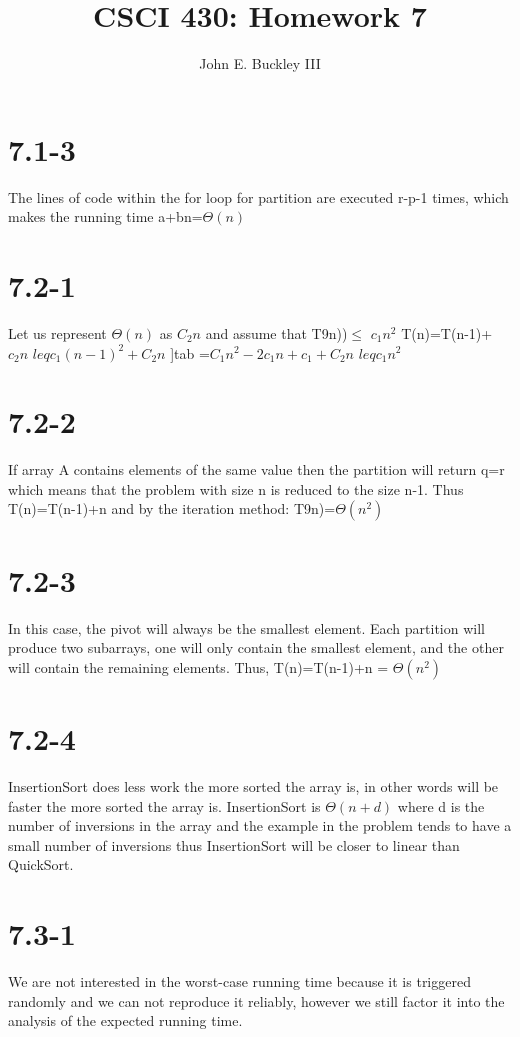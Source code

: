 \documentclass[12pt]{article}
\author{John E. Buckley III}
\title{CSCI 430: Homework 7}
\newcommand\tab[1][1cm]{\hspace*{#1}}
\begin{document}
\maketitle

\section{7.1-3}
The lines of code within the for loop for partition are executed r-p-1 times, which makes the running time a+bn=$\Theta(n)$

\section{7.2-1}
Let us represent $\Theta(n)$ as $C_2n$ and assume that T9n))$\leq$ $c_1n^2$ \newline
\tab T(n)=T(n-1)+$c_2n$ \newline
\tab \tab $leq c_1(n-1)^2+C_2n$ \newline
\tab ]tab =$C_1n^2-2c_1n+c_1+C_2n$ \newline 
\tab \tab $leq c_1n^2$

\section{7.2-2}
If array A contains elements of the same value then the partition will return q=r which means that the problem with size n is reduced to the size n-1. Thus T(n)=T(n-1)+n and by the iteration method: T9n)=$\Theta(n^2)$

\section{7.2-3}
In this case, the pivot will always be the smallest element. Each partition will produce two subarrays, one will only contain the smallest element, and the other will contain the remaining elements. Thus, T(n)=T(n-1)+n = $\Theta(n^2)$

\section{7.2-4}
InsertionSort does less work the more sorted the array is, in other words will be faster the more sorted the array is. InsertionSort is $\Theta(n+d)$ where d is the number of inversions in the array and the example in the problem tends to have a small number of inversions thus InsertionSort will be closer to linear than QuickSort.

\section{7.3-1}
We are not interested in the worst-case running time because it is triggered randomly and we can not reproduce it reliably, however we still factor it into the analysis of the expected running time.
\end{document}
